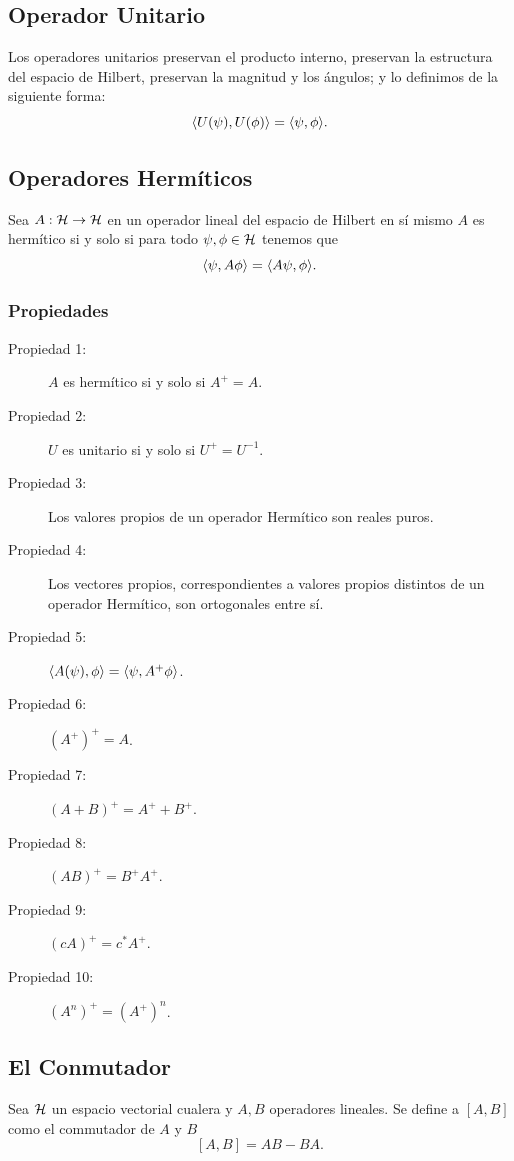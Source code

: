 \subsection{Operador Unitario}
Los operadores unitarios preservan el producto interno, preservan la estructura del espacio de Hilbert, preservan la magnitud y los ángulos; y lo definimos de la siguiente forma:
	$$ \langle U(\psi) , U(\phi) \rangle = \langle \psi , \phi \rangle. $$
	
\subsection{Operadores Hermíticos}
Sea $A:\mathcal{H} \to \mathcal{H}$ en un operador lineal del espacio de Hilbert en sí mismo $A$ es hermítico si y solo si para todo $\psi, \phi \in \mathcal{H}$ tenemos que 
	$$ \langle \psi , A\phi \rangle = \langle A\psi , \phi \rangle. $$
	
\subsubsection{Propiedades}
\begin{description}
	\item[Propiedad 1: ] $A$ es hermítico si y solo si $A^+ = A$.
	\item[Propiedad 2: ] $U$ es unitario si y solo si $U^+ = U^{-1}$.
	\item[Propiedad 3:] Los valores propios de un operador Hermítico son reales puros.
	\item[Propiedad 4: ] Los vectores propios, correspondientes a valores propios distintos de un operador Hermítico, son ortogonales entre sí.
	\item[Propiedad 5: ] $\langle A(\psi) , \phi \rangle = \langle \psi , A^+ \phi \rangle$.
	\item[Propiedad 6: ] $(A^+)^+ = A$.
	\item[Propiedad 7: ] $(A+B)^+ = A^+ + B^+$.
	\item[Propiedad 8: ] $(AB)^+ = B^+ A^+$.
	\item[Propiedad 9: ] $(cA)^+ = c^* A^+$.
	\item[Propiedad 10: ] $(A^n)^+ = (A^+)^n$.
\end{description}


\subsection{El Conmutador}
Sea $\mathcal{H}$ un espacio vectorial cualera y $A,B$ operadores lineales. Se define a $[A,B]$ como el commutador de $A$ y $B$
	$$ [A,B] = AB - BA. $$


